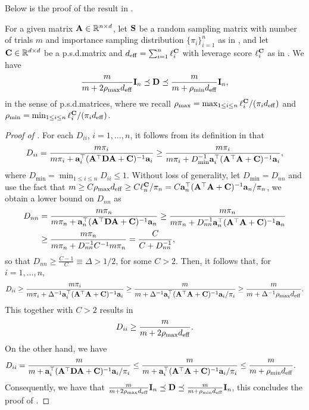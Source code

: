 \documentclass[11pt,a4paper]{article}
\begin{document}
Below is the proof of the result in .
\begin{lemma}\label{lem:range_D}
For a given matrix $\A\in \RR^{n\times d}$,
let $\S$ be a random sampling  matrix with number of trials $m$ and importance sampling distribution $\{ \pi_i \}_{i=1}^n$ as in , and let $\C\in \RR^{d\times d}$ be a p.s.d.\@ matrix and $d_{\eff}= \sum_{i=1}^n \ell^{\C}_i$ with  leverage score $ \ell^{\C}_i $ as in . We have
\begin{align}
    \frac{m}{m+2\rho_{\max} d_{\eff}}\I_n \preceq \D \preceq \frac{m}{m+\rho_{\min}d_{\eff}}\I_n,  \nonumber
\end{align}
in the sense of p.s.d.\@ matrices, where we recall $\rho_{\max}=\max_{1\leq i\leq n} \ell_i^\C/(\pi_id_{\eff})$ and $\rho_{\min}=\min_{1\leq i\leq n} \ell_i^\C/(\pi_id_{\eff})$.
\end{lemma}
\begin{proof}[Proof of ]
For each $D_{ii}$, $i=1,\ldots, n$, it follows from its definition in  that
 \begin{align}
   D_{ii}=  \frac{m\pi_i}{ m\pi_i + \ba_i^\top (\A^\top \D \A + \C)^{-1} \ba_i }\geq\frac{m\pi_i}{ m\pi_i + D^{-1}_{\min}\ba_i^\top (\A^\top  \A+\C)^{-1} \ba_i },\nonumber
 \end{align}
 where $D_{\min}=\min_{1 \leq i \leq n} D_{ii} \leq 1$. 
 Without loss of generality, let $D_{\min}=D_{nn}$ and use the fact that $m\geq C \rho_{\max} d_{\eff} \geq C \ell_n^\C/\pi_n =  C\ba_n^\top (\A^\top  \A+\C)^{-1} \ba_n /\pi_n$, we obtain a lower bound on $D_{nn}$ as
 \begin{align}
    D_{nn}&=  \frac{m\pi_n}{ m\pi_n + \ba_n^\top (\A^\top \D \A + \C)^{-1} \ba_n }\geq\frac{m\pi_n}{ m\pi_n + D^{-1}_{nn}\ba_n^\top (\A^\top  \A+\C)^{-1} \ba_n}\nonumber\\
     &\geq \frac{m\pi_n}{ m\pi_n + D^{-1}_{nn}C^{-1}m\pi_n}=\frac{C}{C +  D^{-1}_{nn} },\nonumber
 \end{align}
 so that $D_{nn} \geq \frac{C-1}{C} \equiv \Delta > 1/2$, for some $C > 2$. 
 Then, it follows that, for $i = 1, \ldots, n$, 
 \begin{align}
     D_{ii}\geq  \frac{m\pi_i}{ m\pi_i +\Delta^{-1} \ba_i^\top (\A^\top  \A+\C)^{-1} \ba_i }\geq  \frac{m}{ m+\Delta^{-1} \ba_i^\top (\A^\top  \A+\C)^{-1} \ba_i/\pi_i }
     \geq \frac{m}{ m +\Delta^{-1}  \rho_{\max} d_{\eff}}.\nonumber
 \end{align}
 This together with $C>2$ results in
 \begin{align}
     D_{ii}\geq  \frac{m}{ m +2  \rho_{\max} d_{\eff}}.\nonumber
 \end{align}
On the other hand,  we have
\begin{align}
    D_{ii}&=  \frac{m}{ m+ \ba_i^\top (\A^\top \D \A + \C)^{-1} \ba_i/\pi_i }\leq\frac{m}{ m + \ba_i^\top (\A^\top  \A+\C)^{-1} \ba_i /\pi_i }\leq \frac{m}{ m +\rho_{\min} d_{\eff} }. \nonumber
\end{align}
Consequently, we have that $\frac{m}{ m +2  \rho_{\max} d_{\eff}}\I_n\preceq\D\preceq \frac{m}{ m +\rho_{\min} d_{\eff}}\I_n$, this concludes the proof of .
\end{proof}
\end{document}
